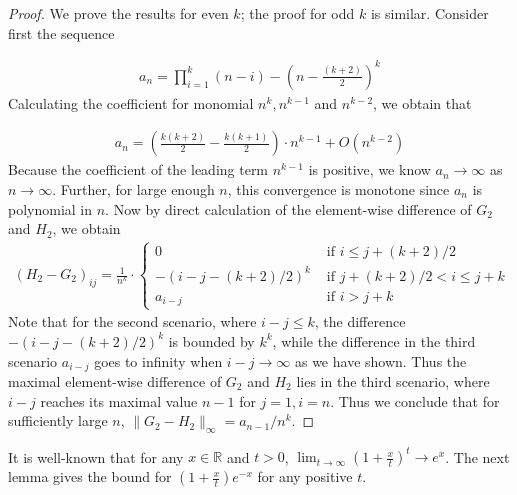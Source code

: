\documentclass[a4paper]{article}
\newcommand{\RR}{\mathbb{R}}
\begin{document}
\begin{proof}
We prove the results for even $k$; the proof for odd $k$ is similar. Consider first the sequence

\begin{align*}
a_n = \prod_{i=1}^k (n-i) - (n-\frac{(k+2)}{2})^k
\end{align*}
Calculating the coefficient for monomial $n^k, n^{k-1}$ and $n^{k-2}$, we obtain that

\begin{align*}
a_n = (\frac{k(k+2)}{2} - \frac{k(k+1)}{2})\cdot n^{k-1} + O(n^{k-2})
\end{align*}
Because the coefficient of the leading term $n^{k-1}$ is positive, we know $a_n\rightarrow \infty$ as $n\rightarrow \infty$. Further, for large enough $n$, this convergence is monotone since $a_n$ is polynomial in $n$. Now by direct calculation of the element-wise difference of $G_2$ and $H_2$, we obtain
\begin{align*}
(H_2-G_2)_{ij} = \frac{1}{n^k}\cdot
\begin{cases}
0 & \text{ if } i\leq j + (k+2)/2\\
-(i-j - (k+2)/2)^k & \text{ if } j + (k+2)/2 < i \leq j + k\\
a_{i-j} &\text{ if } i > j+k
\end{cases}
\end{align*}
Note that for the second scenario, where $i - j\leq k$, the difference $-(i-j-(k+2)/2)^k$ is bounded by $k^k$, while the difference in the third scenario $a_{i-j}$ goes to infinity when $i-j\rightarrow \infty$ as we have shown. Thus the maximal element-wise difference of $G_2$ and $H_2$ lies in the third scenario, where $i-j$ reaches its maximal value $n-1$ for $j = 1, i = n$. Thus we conclude that for sufficiently large $n$, $\|G_2-H_2\|_\infty = a_{n-1}/n^k$.
\end{proof}

It is well-known that for any $x\in\RR$ and $t>0$, $\lim_{t\rightarrow\infty}(1 + \frac{x}{t})^t \rightarrow e^x$. The next lemma gives the bound for $(1+\frac{x}{t})e^{-x}$ for any positive $t$.
\end{document}
